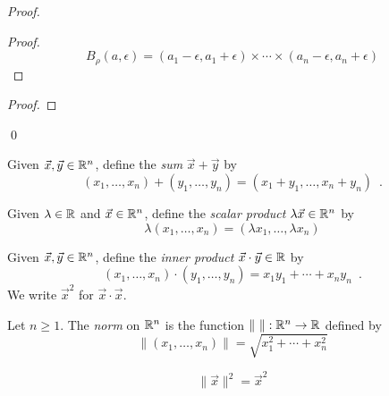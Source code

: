 \begin{proof}
    \pf
    \begin{proof}
        \pf
        \[ B_\rho(a, \epsilon) = (a_1 - \epsilon, a_1 + \epsilon) \times \cdots \times (a_n - \epsilon, a_n + \epsilon) \]
    \end{proof}
    \begin{proof}
    \end{proof}
    \qed
\end{proof}

\begin{definition}
    Given $\vec{x}, \vec{y} \in \mathbb{R}^n$, define the \emph{sum} $\vec{x} + \vec{y}$ by
    \[ (x_1, \ldots, x_n) + (y_1, \ldots, y_n) = (x_1 + y_1, \ldots, x_n + y_n) \enspace . \]
\end{definition}

\begin{definition}
    Given $\lambda \in \mathbb{R}$ and $\vec{x} \in \mathbb{R}^n$, define the \emph{scalar product} $\lambda \vec{x} \in \mathbb{R}^n$ by
    \[ \lambda (x_1, \ldots, x_n) = (\lambda x_1, \ldots, \lambda x_n) \]
\end{definition}

\begin{definition}
    Given $\vec{x}, \vec{y} \in \mathbb{R}^n$, define the \emph{inner product} $\vec{x} \cdot \vec{y} \in \mathbb{R}$ by
    \[ (x_1, \ldots, x_n) \cdot (y_1, \ldots, y_n) = x_1 y_1 + \cdots + x_n y_n \enspace . \]
    We write $\vec{x}^2$ for $\vec{x} \cdot \vec{x}$.
\end{definition}

\begin{definition}[Norm]
    Let $n \geq 1$. The \emph{norm} on $\mathbb{R}^n$ is the function $\| \ \| : \mathbb{R}^n \rightarrow \mathbb{R}$ defined by
    \[ \| (x_1, \ldots, x_n) \| = \sqrt{x_1^2 + \cdots + x_n^2} \]
\end{definition}

\begin{lemma}
    \[ \| \vec{x} \|^2 = \vec{x}^2 \]
\end{lemma}


